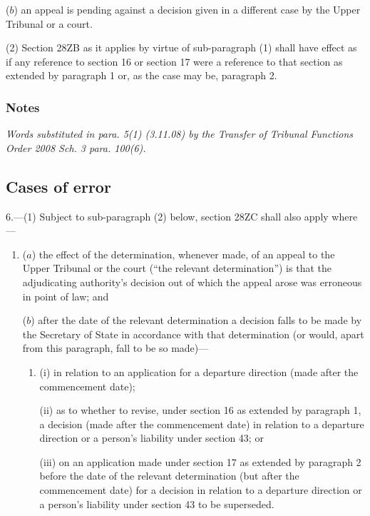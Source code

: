 \documentclass[a4paper]{article}
\newcommand\amendment[1]{\subsubsection*{Notes}{\itshape\frenchspacing\footnotesize #1 \par}}
\begin{document}
{\begin{enumerate}
($b$) an appeal is pending against a decision given in a different case by the Upper Tribunal or a court.
\end{enumerate}

(2) Section 28ZB as it applies by virtue of sub-paragraph (1) shall have effect as if any reference to section 16 or section 17 were a reference to that section as extended by paragraph 1 or, as the case may be, paragraph 2.

\amendment{
Words substituted in para. 5(1) (3.11.08) by the Transfer of Tribunal Functions Order 2008  Sch. 3 para. 100(6).
}

\subsection*{Cases of error}

\begin{sloppypar}
6.---(1) Subject to sub-paragraph (2) below, section 28ZC shall also apply where---
\end{sloppypar}
\begin{enumerate}\item[]
($a$) the effect of the determination, whenever made, of an appeal to the Upper Tribunal or the court (“the relevant determination”) is that the adjudicating authority’s decision out of which the appeal arose was erroneous in point of law; and

($b$) after the date of the relevant determination a decision falls to be made by the Secretary of State in accordance with that determination (or would, apart from this paragraph, fall to be so made)---
\begin{enumerate}\item[]
(i) in relation to an application for a departure direction (made after the commencement date);

(ii) as to whether to revise, under section 16 as extended by paragraph 1, a decision (made after the commencement date) in relation to a departure direction
or a person’s liability under section 43; or

(iii) on an application made under section 17 as extended by paragraph 2 before the date of the relevant determination (but after the commencement date) for a decision in relation to a departure direction
or a person’s liability under section 43 to be superseded.
\end{enumerate}
\end{enumerate}

}
\end{document}
